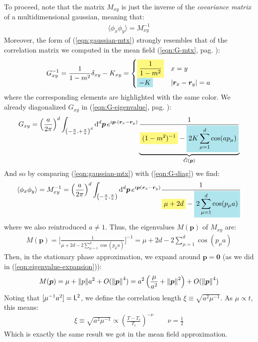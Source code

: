 \documentclass[../../main.tex]{subfiles}
\begin{document}
To proceed, note that the matrix $M_{xy}$ is just the inverse of the \textit{covariance matrix} of a multidimensional gaussian, meaning that:
\begin{align*}
    \langle \phi_x \phi_y \rangle = M_{xy}^{-1}
\end{align*} 
Moreover, the form of (\ref{eqn:gaussian-mtx}) strongly resembles that of the correlation matrix we computed in the mean field (\ref{eqn:G-mtx}, pag. \pageref{eqn:G-mtx}):
\begin{align*}
    G_{xy}^{-1} = \frac{1}{1-m^2} \delta_{xy} - K_{xy} = \begin{cases}
        \hlc{Yellow}{\frac{1}{1-m^2}} & x=y\\
        \hlc{SkyBlue}{-K} & |\bm{r}_x-\bm{r}_y| = a 
    \end{cases}  
\end{align*}
where the corresponding elements are highlighted with the same color. We already diagonalized $G_{xy}$ in (\ref{eqn:G-eigenvalue}, pag. \pageref{eqn:G-eigenvalue}):
\begin{align}\label{eqn:G-diag}
    G_{xy} = \left(\frac{a}{2\pi} \right)^{d} \int_{\left(-\frac{\pi}{a},+\frac{\pi}{a}  \right)^d} \dd[d]{\bm{p}} e^{i \bm{p} \cdot (\bm{r}_x - \bm{r}_y)} \underbrace{\frac{1}{\displaystyle \hlc{Yellow}{(1-m^2)^{-1}} - \hlc{SkyBlue}{2K \sum_{\mu=1}^d \cos(a p_\mu)}}}_{\tilde{G}(\bm{p})}
\end{align}
And so by comparing (\ref{eqn:gaussian-mtx}) with (\ref{eqn:G-diag}) we find:
\begin{align*}
    \langle \phi_x \phi_y \rangle = M_{xy}^{-1} = \left(\frac{a}{2\pi} \right)^d \int_{\left(-\frac{\pi}{a}, \frac{\pi}{a}\right)} \dd[d]{\bm{p}} e^{i \bm{p}(\bm{r}_x - \bm{r}_y)} \frac{1}{\displaystyle \hlc{Yellow}{\mu + 2d} - \hlc{SkyBlue}{2 \sum_{\mu=1}^d \cos(p_\mu a)}} 
\end{align*}
where we also reintroduced $a \neq 1$. Thus, the eigenvalues $M(\bm{p})$ of $M_{xy}$ are:
\begin{align*}
    M(\bm{p}) = \Big[\frac{1}{\mu + 2d - 2 \sum_{\mu=1}^d \cos(p_\mu a)} \Big]^{-1} = \mu + 2d - 2 \sum_{\mu=1}^d \cos(p_\mu a)
\end{align*}
Then, in the stationary phase approximation, we expand around $\bm{p} = \bm{0}$ (as we did in (\ref{eqn:eigenvalue-expansion})):
\begin{align*}
    M(\bm{p}) = \mu + \norm{p} a^2 + O(\norm{\bm{p}}^4) = a^2 \left(\frac{\mu}{a^2} + \norm{\bm{p}}^2 \right) + O(\norm{\bm{p}}^4)
\end{align*}
Noting that $[\mu^{-1} a^2] = \sf{L}^2$, we define the correlation length $\xi \equiv \sqrt{a^2 \mu^{-1}}$. As $\mu \propto t$, this means:
\begin{align*}
    \xi \equiv \sqrt{a^2 \mu^{-1}} \propto \left(\frac{T-T_c}{T_c} \right)^{-\nu} \qquad \nu = \frac{1}{2} 
\end{align*}
Which is exactly the same result we got in the mean field approximation.
\end{document}
